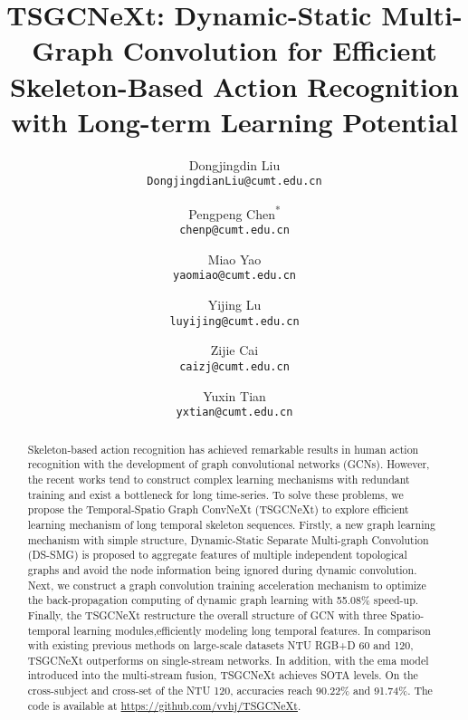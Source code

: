 \documentclass[10pt,twocolumn,letterpaper]{article}
\begin{document}
\title{TSGCNeXt: Dynamic-Static Multi-Graph Convolution for Efficient Skeleton-Based Action Recognition with Long-term Learning Potential}

\author{Dongjingdin Liu\\
{\tt\small DongjingdianLiu@cumt.edu.cn}
\and
Pengpeng Chen\textsuperscript{*}\\
{\tt\small chenp@cumt.edu.cn}
\and
Miao Yao\\
{\tt\small yaomiao@cumt.edu.cn}\\
\and
Yijing Lu\\ 
{\tt\small  luyijing@cumt.edu.cn}\\
\and
Zijie Cai\\
{\tt\small caizj@cumt.edu.cn}\\
\and
Yuxin Tian\\
{\tt\small yxtian@cumt.edu.cn}
}

\maketitle

\ificcvfinal\thispagestyle{empty}\fi


\begin{abstract}
Skeleton-based action recognition has achieved remarkable results in human action recognition with the development of graph convolutional networks (GCNs). 
However, the recent works tend to construct complex learning mechanisms with redundant training and exist a bottleneck for long time-series.
To solve these problems, we propose the Temporal-Spatio Graph ConvNeXt (TSGCNeXt) to explore efficient learning mechanism of long temporal skeleton sequences.
Firstly, a new graph learning mechanism with simple structure, Dynamic-Static Separate Multi-graph Convolution (DS-SMG) is proposed to aggregate features of multiple independent topological graphs and avoid the node information being ignored during dynamic convolution.
Next, we construct a graph convolution training acceleration mechanism to optimize the back-propagation computing of dynamic graph learning with 55.08\% speed-up.
Finally, the TSGCNeXt restructure the overall structure of GCN with three Spatio-temporal learning modules,efficiently modeling long temporal features. 
In comparison with existing previous methods on large-scale datasets NTU RGB+D 60 and 120, TSGCNeXt outperforms on single-stream networks. In addition, with the ema model introduced into the multi-stream fusion, TSGCNeXt achieves SOTA levels. On the cross-subject and cross-set of the NTU 120, accuracies reach 90.22\% and 91.74\%. The code is available at \url{https://github.com/vvhj/TSGCNeXt}.
\end{abstract}
\end{document}
